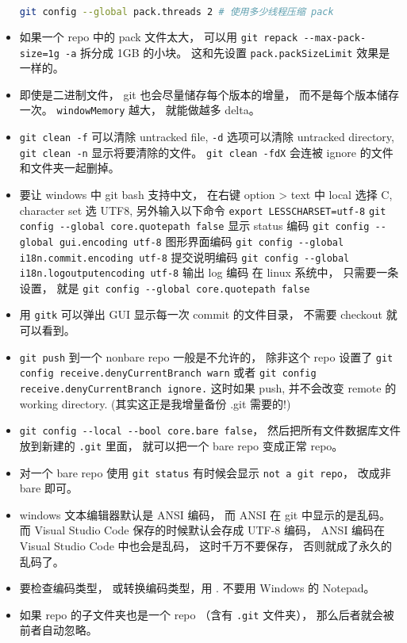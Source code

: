 \begin{itemize}
\begin{lstlisting}[language=bash]
git config --global pack.threads 2 # 使用多少线程压缩 pack
\end{lstlisting}
\item 如果一个 repo 中的 pack 文件太大， 可以用 \verb`git repack --max-pack-size=1g -a` 拆分成 1GB 的小块。 这和先设置 \verb`pack.packSizeLimit` 效果是一样的。
\item 即使是二进制文件， git 也会尽量储存每个版本的增量， 而不是每个版本储存一次。 \verb`windowMemory` 越大， 就能做越多 delta。
\item \verb`git clean -f` 可以清除 untracked file, \verb`-d` 选项可以清除 untracked directory,  \verb`git clean -n` 显示将要清除的文件。 \verb`git clean -fdX` 会连被 ignore 的文件和文件夹一起删掉。
\item 要让 windows 中 git bash 支持中文， 在右键 option > text 中 local 选择 C, character set 选 UTF8, 另外输入以下命令
\verb`export LESSCHARSET=utf-8`
\verb`git config --global core.quotepath false`     显示 status 编码
\verb`git config --global gui.encoding utf-8`    图形界面编码
\verb`git config --global i18n.commit.encoding utf-8`   提交说明编码
\verb`git config --global i18n.logoutputencoding utf-8` 输出 log 编码
在 linux 系统中， 只需要一条设置， 就是
\verb`git config --global core.quotepath false`
\item 用 \verb`gitk` 可以弹出 GUI 显示每一次 commit 的文件目录， 不需要 checkout 就可以看到。
\item \verb`git push` 到一个 nonbare repo 一般是不允许的， 除非这个 repo 设置了 \verb`git config receive.denyCurrentBranch warn` 或者 \verb`git config receive.denyCurrentBranch ignore.` 这时如果 push, 并不会改变 remote 的 working directory. (其实这正是我增量备份 .git 需要的!)
\item \verb`git config --local --bool core.bare false`， 然后把所有文件数据库文件放到新建的 \verb`.git` 里面， 就可以把一个 bare repo 变成正常 repo。
\item 对一个 bare repo 使用 \verb`git status` 有时候会显示 \verb`not a git repo`， 改成非 bare 即可。
\item windows 文本编辑器默认是 ANSI 编码， 而 ANSI 在 git 中显示的是乱码。 而 Visual Studio Code 保存的时候默认会存成 UTF-8 编码， ANSI 编码在 Visual Studio Code 中也会是乱码， 这时千万不要保存， 否则就成了永久的乱码了。
\item 要检查编码类型， 或转换编码类型，用 . 不要用 Windows 的 Notepad。
\item 如果 repo 的子文件夹也是一个 repo （含有 \verb`.git` 文件夹）， 那么后者就会被前者自动忽略。
\end{itemize}


